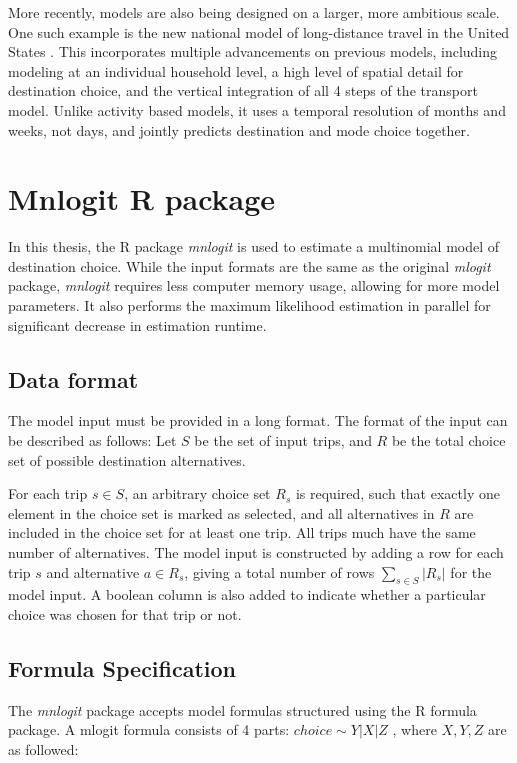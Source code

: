 More recently, models are also being designed on a larger, more ambitious scale. One such example is the new national model of long-distance travel in the United States \parencite{Outwater15}. This incorporates multiple advancements on previous models, including modeling at an individual household level, a high level of spatial detail for destination choice, and the vertical integration of all 4 steps of the transport model. Unlike activity based models, it uses a temporal resolution of months and weeks, not days, and jointly predicts destination and mode choice together. 

\section{Mnlogit R package}
\label{section:mnlogit-structure}
\label{section:mnlogit}
In this thesis, the R package \textit{mnlogit} \parencite{hasan2014fast} is used to estimate a multinomial model of destination choice. While the input formats are the same as the original \textit{mlogit} package, \textit{mnlogit} requires less computer memory usage, allowing for more model parameters. It also performs the maximum likelihood estimation in parallel for significant decrease in estimation runtime.
\subsection*{Data format}
The model input must be provided in a long format. The format of the input can be described as follows:
Let \(S\)  be the set of input trips, and \(R\)  be the total choice set of possible destination alternatives. 

For each trip $s \in S$, an arbitrary choice set $R_s$ is required, such that exactly one element in the choice set is marked as selected, and all alternatives in $R$ are included in the choice set for at least one trip. All trips much have the same number of alternatives.
The model input is constructed by adding a row for each trip $s$ and alternative $a \in R_s$, giving a total number of rows  $ \sum_{s \in S} |R_s| $  for the model input. A boolean column is also added to indicate whether a particular choice was chosen for that trip or not.

\subsection*{Formula Specification}
The \textit{mnlogit} package accepts model formulas structured using the R formula package. A mlogit formula consists of 4 parts: $ choice \sim Y | X | Z $ , where $X,Y,Z$ are as followed:

